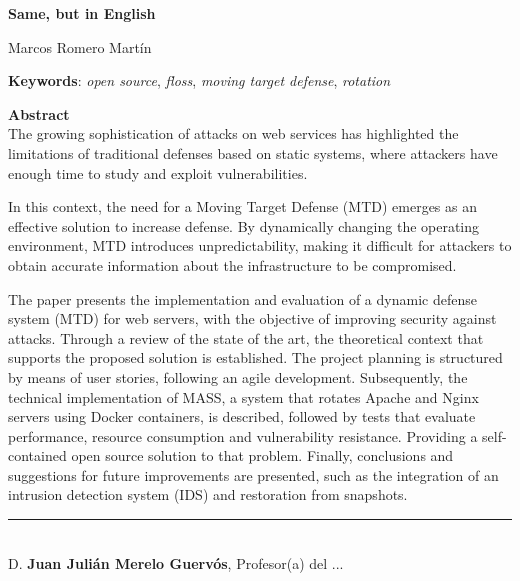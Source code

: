 \cleardoublepage

\begin{center}
	{\large\bfseries Same, but in English}\\
\end{center}
\begin{center}
	Marcos Romero Martín\\
\end{center}
\vspace{0.5cm}
\noindent\textbf{Keywords}: \textit{open source}, \textit{floss}, \textit{moving target defense},  \textit{rotation}
\vspace{0.7cm}

\noindent\textbf{Abstract}\\
The growing sophistication of attacks on web services has highlighted the limitations of traditional defenses based on static systems, where attackers have enough time to study and exploit vulnerabilities.

In this context, the need for a Moving Target Defense (MTD) emerges as an effective solution to increase defense. By dynamically changing the operating environment, MTD introduces unpredictability, making it difficult for attackers to obtain accurate information about the infrastructure to be compromised.

The paper presents the implementation and evaluation of a dynamic defense system (MTD) for web servers, with the objective of improving security against attacks. Through a review of the state of the art, the theoretical context that supports the proposed solution is established. The project planning is structured by means of user stories, following an agile development. Subsequently, the technical implementation of MASS, a system that rotates Apache and Nginx servers using Docker containers, is described, followed by tests that evaluate performance, resource consumption and vulnerability resistance. Providing a self-contained open source solution to that problem. Finally, conclusions and suggestions for future improvements are presented, such as the integration of an intrusion detection system (IDS) and restoration from snapshots.

\cleardoublepage

\thispagestyle{empty}

\noindent\rule[-1ex]{\textwidth}{2pt}\\[4.5ex]

D. \textbf{Juan Julián Merelo Guervós}, Profesor(a) del ...

\vspace{0.5cm}

